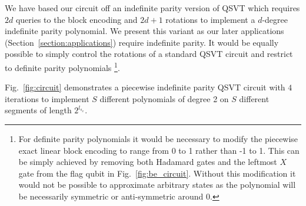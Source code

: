 \documentclass[aps,prx,twocolumn,floatfix,10pt,amssymb,amsfont,amsmath,superscriptaddress,float,nofootinbib,longbibliography,nobalancelastpage]{revtex4-2}
\theoremstyle{empty}
\begin{document}
We have based our circuit off an indefinite parity version of QSVT \cite{sunderhauf2023generalizedquantumsingularvalue} which requires $2d$ queries to the block encoding and $2d + 1$ rotations to implement a $d$-degree indefinite parity polynomial. We present this variant as our later applications (Section~\ref{section:applications}) require indefinite parity. It would be equally possible to simply control the rotations of a standard QSVT circuit and restrict to definite parity polynomials \footnote{For definite parity polynomials it would be necessary to modify the piecewise exact linear block encoding to range from 0 to 1 rather than -1 to 1. This can be simply achieved by removing both Hadamard gates and the leftmost $X$ gate from the flag qubit in Fig.~\ref{fig:be_circuit}. Without this modification it would not be possible to approximate arbitrary states as the polynomial will be necessarily symmetric or anti-symmetric around 0.}.


Fig.~\ref{fig:circuit} demonstrates a piecewise indefinite parity QSVT circuit with $4$ iterations to implement $S$ different polynomials of degree 2 on $S$ different segments of length $2^{l_{s_x}}$.
\end{document}
